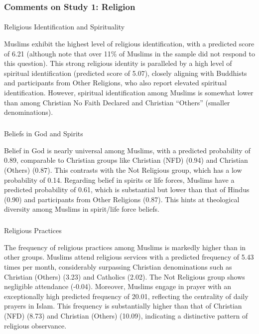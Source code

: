 \documentclass[
  single column]{article}
\makeatletter
\let\oldparagraph\paragraph
\renewcommand{\paragraph}{
    \@ifstar
      \xxxParagraphStar
      \xxxParagraphNoStar
  }
\newcommand{\xxxParagraphStar}[1]{\oldparagraph*{#1}\mbox{}}
\newcommand{\xxxParagraphNoStar}[1]{\oldparagraph{#1}\mbox{}}
\let\oldsubparagraph\subparagraph
\renewcommand{\subparagraph}{
    \@ifstar
      \xxxSubParagraphStar
      \xxxSubParagraphNoStar
  }
\newcommand{\xxxSubParagraphStar}[1]{\oldsubparagraph*{#1}\mbox{}}
\newcommand{\xxxSubParagraphNoStar}[1]{\oldsubparagraph{#1}\mbox{}}
\makeatother
\begin{document}
\subsubsection{Comments on Study 1:
Religion}\label{comments-on-study-1-religion}

\paragraph{Religious Identification and
Spirituality}\label{religious-identification-and-spirituality}

Muslims exhibit the highest level of religious identification, with a
predicted score of 6.21 (although note that over 11\% of Muslims in the
sample did not respond to this question). This strong religious identity
is paralleled by a high level of spiritual identification (predicted
score of 5.07), closely aligning with Buddhists and participants from
Other Religions, who also report elevated spiritual identification.
However, spiritual identification among Muslims is somewhat lower than
among Christian No Faith Declared and Christian ``Others'' (smaller
denominations).

\subparagraph{Beliefs in God and
Spirits}\label{beliefs-in-god-and-spirits}

Belief in God is nearly universal among Muslims, with a predicted
probability of 0.89, comparable to Christian groups like Christian (NFD)
(0.94) and Christian (Others) (0.87). This contrasts with the Not
Religious group, which has a low probability of 0.14. Regarding belief
in spirits or life forces, Muslims have a predicted probability of 0.61,
which is substantial but lower than that of Hindus (0.90) and
participants from Other Religions (0.87). This hints at theological
diversity among Muslims in spirit/life force beliefs.

\subparagraph{Religious Practices}\label{religious-practices}

The frequency of religious practices among Muslims is markedly higher
than in other groups. Muslims attend religious services with a predicted
frequency of 5.43 times per month, considerably surpassing Christian
denominations such as Christian (Others) (3.23) and Catholics (2.02).
The Not Religious group shows negligible attendance (-0.04). Moreover,
Muslims engage in prayer with an exceptionally high predicted frequency
of 20.01, reflecting the centrality of daily prayers in Islam. This
frequency is substantially higher than that of Christian (NFD) (8.73)
and Christian (Others) (10.09), indicating a distinctive pattern of
religious observance.
\end{document}
